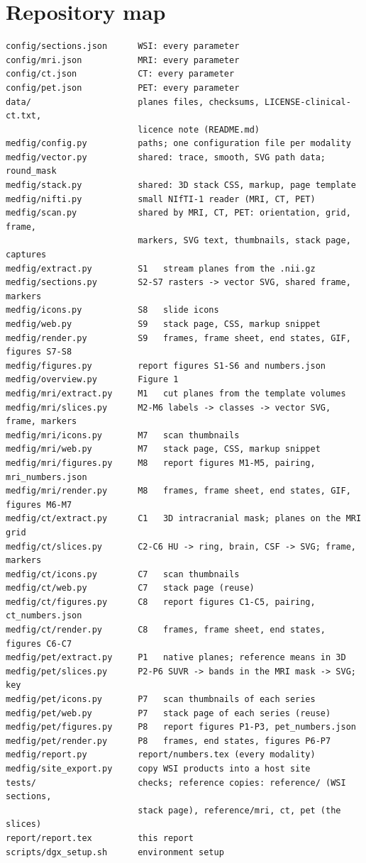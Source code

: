 \documentclass[10pt,a4paper]{article}
\begin{document}
\appendix
\section{Repository map}
\begin{lstlisting}[escapechar=|]
config/sections.json      WSI: every parameter
config/mri.json           MRI: every parameter
config/ct.json            CT: every parameter
config/pet.json           PET: every parameter
data/                     planes files, checksums, LICENSE-clinical-ct.txt,
                          licence note (README.md)
medfig/config.py          paths; one configuration file per modality
medfig/vector.py          shared: trace, smooth, SVG path data; round_mask
medfig/stack.py           shared: 3D stack CSS, markup, page template
medfig/nifti.py           small NIfTI-1 reader (MRI, CT, PET)
medfig/scan.py            shared by MRI, CT, PET: orientation, grid, frame,
                          markers, SVG text, thumbnails, stack page, captures
medfig/extract.py         S1   stream planes from the .nii.gz
medfig/sections.py        S2-S7 rasters -> vector SVG, shared frame, markers
medfig/icons.py           S8   slide icons
medfig/web.py             S9   stack page, CSS, markup snippet
medfig/render.py          S9   frames, frame sheet, end states, GIF, figures S7-S8
medfig/figures.py         report figures S1-S6 and numbers.json
medfig/overview.py        Figure 1
medfig/mri/extract.py     M1   cut planes from the template volumes
medfig/mri/slices.py      M2-M6 labels -> classes -> vector SVG, frame, markers
medfig/mri/icons.py       M7   scan thumbnails
medfig/mri/web.py         M7   stack page, CSS, markup snippet
medfig/mri/figures.py     M8   report figures M1-M5, pairing, mri_numbers.json
medfig/mri/render.py      M8   frames, frame sheet, end states, GIF, figures M6-M7
medfig/ct/extract.py      C1   3D intracranial mask; planes on the MRI grid
medfig/ct/slices.py       C2-C6 HU -> ring, brain, CSF -> SVG; frame, markers
medfig/ct/icons.py        C7   scan thumbnails
medfig/ct/web.py          C7   stack page (reuse)
medfig/ct/figures.py      C8   report figures C1-C5, pairing, ct_numbers.json
medfig/ct/render.py       C8   frames, frame sheet, end states, figures C6-C7
medfig/pet/extract.py     P1   native planes; reference means in 3D
medfig/pet/slices.py      P2-P6 SUVR -> bands in the MRI mask -> SVG; key
medfig/pet/icons.py       P7   scan thumbnails of each series
medfig/pet/web.py         P7   stack page of each series (reuse)
medfig/pet/figures.py     P8   report figures P1-P3, pet_numbers.json
medfig/pet/render.py      P8   frames, end states, figures P6-P7
medfig/report.py          report/numbers.tex (every modality)
medfig/site_export.py     copy WSI products into a host site
tests/                    checks; reference copies: reference/ (WSI sections,
                          stack page), reference/mri, ct, pet (the slices)
report/report.tex         this report
scripts/dgx_setup.sh      environment setup
\end{lstlisting}
\end{document}
